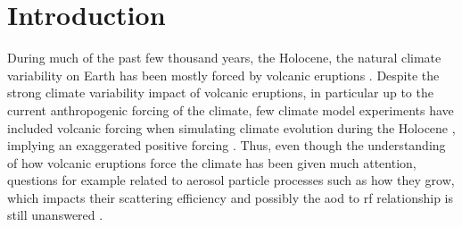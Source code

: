 \documentclass[twocol]{ametsocV6.1}
\begin{document}

\section{Introduction}




During much of the past few thousand years, the Holocene, the natural climate
variability on Earth has been mostly forced by volcanic eruptions \citep{sigl2022}.
Despite the strong climate variability impact of volcanic eruptions, in particular up to
the current anthropogenic forcing of the climate, few climate model experiments have
included volcanic forcing when simulating climate evolution during the Holocene
\citep{sigl2022}, implying an exaggerated positive forcing \citep{gregory2016}. Thus,
even though the understanding of how volcanic eruptions force the climate has been given
much attention, questions for example related to aerosol particle processes such as how
they grow, which impacts their scattering efficiency and possibly the \gls{aod} to
\gls{rf} relationship is still unanswered
\citep[e.g.][]{robock2000,zanchettin2019,marshall2020,marshall2022}.
\end{document}
